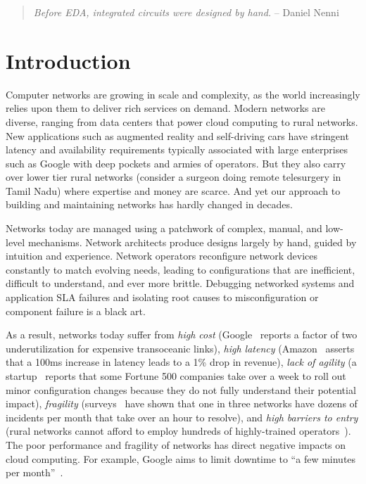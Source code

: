 \begin{quote}
{\em Before EDA, integrated circuits were designed by hand.} -- Daniel Nenni~\cite{wikicite}
\vspace{-2mm}
\end{quote}

\section{Introduction}

Computer networks are growing in scale and complexity, as the world increasingly relies upon them to deliver rich services on demand.  Modern networks are diverse, ranging from data centers that power cloud computing to rural networks.  New applications such as augmented reality and self-driving cars have stringent latency and availability requirements typically associated with large enterprises such as Google with deep pockets and armies of operators. But they also carry over lower tier rural networks (consider a surgeon doing
remote telesurgery in Tamil Nadu) where expertise and money are scarce. And yet our approach to building and maintaining networks has hardly changed in decades.

Networks today are managed using a patchwork of complex, manual, and low-level mechanisms. Network architects produce designs largely by hand, guided by intuition and experience. Network operators reconfigure network devices constantly to match evolving needs, leading to configurations that are inefficient, difficult to understand, and ever more brittle.  Debugging
networked systems and application SLA failures and isolating root causes to  
misconfiguration or component failure is a black art.

As a result, networks today suffer from {\em high cost} (Google~\cite{b4} reports a factor of two underutilization for expensive transoceanic links), {\em high latency} (Amazon~\cite{amazon} asserts that a 100ms increase in latency leads to a 1\% drop in revenue), {\em lack of agility} (a startup~\cite{mahajan} reports that some Fortune 500 companies take over a week to roll out minor configuration changes because they do not fully understand their potential impact), {\em fragility} (surveys~\cite{atpg} have shown that one in three networks have dozens of incidents per month that take over an hour to resolve), and {\em high barriers to entry} (rural networks cannot afford to employ hundreds of highly-trained operators~\cite{barathwisp}). The poor performance and fragility of networks has direct negative impacts on cloud computing. For example, Google aims to limit downtime to ``a few minutes per month''~\cite{rameshgoogle}.

